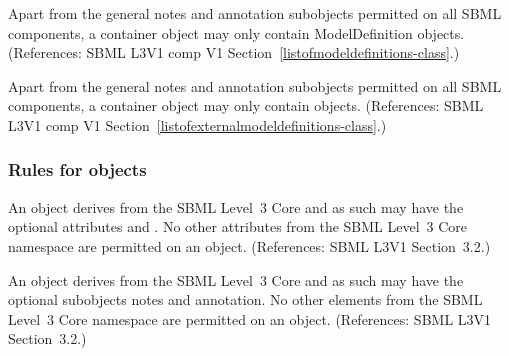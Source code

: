 \begin{sbmlenum}
 { Apart from the general notes and annotation
  subobjects permitted on all SBML components, a \ListOfModelDefinitions
  container object may only contain ModelDefinition objects.
  (References: SBML L3V1 comp V1 Section~\ref{listofmodeldefinitions-class}.) }


 { Apart from the general notes and annotation
  subobjects permitted on all SBML components, a
  \ListOfExternalModelDefinitions container object may only contain
  \ExternalModelDefinition objects.
  (References: SBML L3V1 comp V1 Section~\ref{listofexternalmodeldefinitions-class}.) }
  




\end{sbmlenum} \subsubsection*{Rules for  objects} \begin{sbmlenum}

 { An \ExternalModelDefinition object derives from the SBML
  Level~3 Core  and as such may have the optional attributes
   and . No other attributes from the SBML
  Level~3 Core namespace are permitted on an \ExternalModelDefinition object.
  (References: SBML L3V1 Section~3.2.) }
   

 { An \ExternalModelDefinition object derives from the SBML
  Level~3 Core  and as such may have the optional subobjects
  notes and annotation. No other elements from the SBML
  Level~3 Core namespace are permitted on an \ExternalModelDefinition object.
  (References: SBML L3V1 Section~3.2.) }
   


\end{sbmlenum}
